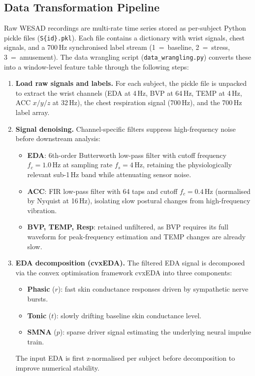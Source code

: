 \documentclass[11pt]{article}
\begin{document}
\subsection{Data Transformation Pipeline}
\label{sec:data-pipeline}
Raw WESAD recordings are multi-rate time series stored as per-subject Python pickle files (\texttt{S\{id\}.pkl}).
Each file contains a dictionary with wrist signals, chest signals, and a 700\,Hz synchronised label stream (1~=~baseline, 2~=~stress, 3~=~amusement).
The data wrangling script (\texttt{data\_wrangling.py}) converts these into a window-level feature table through the following steps:

\begin{enumerate}
    \item \textbf{Load raw signals and labels.}
    For each subject, the pickle file is unpacked to extract the wrist channels (EDA at 4\,Hz, BVP at 64\,Hz, TEMP at 4\,Hz, ACC $x/y/z$ at 32\,Hz), the chest respiration signal (700\,Hz), and the 700\,Hz label array.

    \item \textbf{Signal denoising.}
    Channel-specific filters suppress high-frequency noise before downstream analysis:
    \begin{itemize}
        \item \textbf{EDA}: 6th-order Butterworth low-pass filter with cutoff frequency $f_c = 1.0$\,Hz at sampling rate $f_s = 4$\,Hz, retaining the physiologically relevant sub-1\,Hz band while attenuating sensor noise.
        \item \textbf{ACC}: FIR low-pass filter with 64 taps and cutoff $f_c = 0.4$\,Hz (normalised by Nyquist at 16\,Hz), isolating slow postural changes from high-frequency vibration.
        \item \textbf{BVP, TEMP, Resp}: retained unfiltered, as BVP requires its full waveform for peak-frequency estimation and TEMP changes are already slow.
    \end{itemize}

    \item \textbf{EDA decomposition (cvxEDA).}
    The filtered EDA signal is decomposed via the convex optimisation framework cvxEDA into three components:
    \begin{itemize}
        \item \textbf{Phasic} ($r$): fast skin conductance responses driven by sympathetic nerve bursts.
        \item \textbf{Tonic} ($t$): slowly drifting baseline skin conductance level.
        \item \textbf{SMNA} ($p$): sparse driver signal estimating the underlying neural impulse train.
    \end{itemize}
    The input EDA is first z-normalised per subject before decomposition to improve numerical stability.


\end{enumerate}
\end{document}
